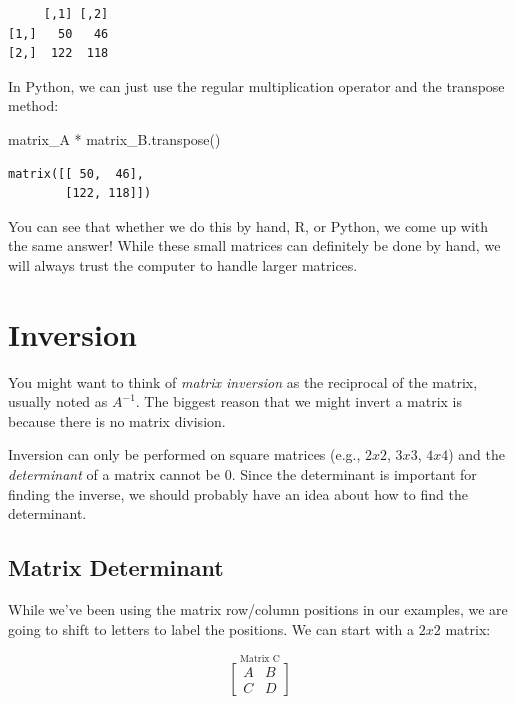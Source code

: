 \documentclass[
  letterpaper,
]{krantz}
\newenvironment{Shaded}{}{}
\newcommand{\NormalTok}[1]{#1}
\newcommand{\OperatorTok}[1]{\textcolor[rgb]{0.40,0.40,0.40}{#1}}
\begin{document}
\begin{verbatim}
     [,1] [,2]
[1,]   50   46
[2,]  122  118
\end{verbatim}

In Python, we can just use the regular multiplication operator and the
transpose method:

\begin{Shaded}
\begin{Highlighting}[]
\NormalTok{matrix\_A }\OperatorTok{*}\NormalTok{ matrix\_B.transpose()}
\end{Highlighting}
\end{Shaded}

\begin{verbatim}
matrix([[ 50,  46],
        [122, 118]])
\end{verbatim}

You can see that whether we do this by hand, R, or Python, we come up
with the same answer! While these small matrices can definitely be done
by hand, we will always trust the computer to handle larger matrices.

\section{Inversion}\label{inversion}

You might want to think of \emph{matrix inversion} as the reciprocal of
the matrix, usually noted as \(A^{-1}\). The biggest reason that we
might invert a matrix is because there is no matrix division.

Inversion can only be performed on square matrices (e.g., \(2x2\),
\(3x3\), \(4x4\)) and the \emph{determinant} of a matrix cannot be 0.
Since the determinant is important for finding the inverse, we should
probably have an idea about how to find the determinant.

\subsection{Matrix Determinant}\label{matrix-determinant}

While we've been using the matrix row/column positions in our examples,
we are going to shift to letters to label the positions. We can start
with a \(2x2\) matrix:

\[
\stackrel{\mbox{Matrix C}}{
\begin{bmatrix}
A & B\\
C & D
\end{bmatrix}
}
\]
\end{document}
